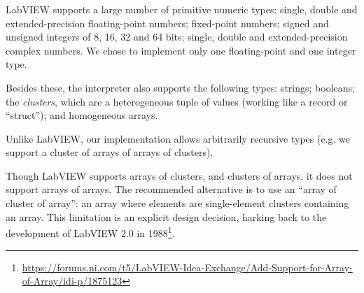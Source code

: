 \begin{hscode}\SaveRestoreHook
{}%
%
%
%
%
%
%
\>[B]{}\;\<[14]%
\>[14]{}\mathrel{=}{}\<[14E]%
\>[17]{}\;\<[E]%
\\
\>[14]{}\mid {}\<[14E]%
\>[17]{}\;\;\<[E]%
\\
\>[14]{}\mid {}\<[14E]%
\>[17]{}\<[E]%
\\
\>[14]{}\mid {}\<[14E]%
\>[17]{}\;\<[E]%
\\
\>[14]{}\mid {}\<[14E]%
\>[17]{}\;\<[E]%
\\
\>[B]{}\<[4]%
\>[4]{}\;\<[E]%
\\[\blanklineskip]%
\>[B]{}\;\<[19]%
\>[19]{}\mathrel{=}\<[E]%
\\
\>[19]{}\mid {}\<[E]%
\\
\>[19]{}\mid {}\<[E]%
\\
\>[19]{}\mid {}\<[E]%
\\
\>[B]{}\<[4]%
\>[4]{}\;\<[E]%
\ColumnHook
\end{hscode}\resethooks

LabVIEW supports a large number of primitive numeric types: single, double and
extended-precision floating-point numbers; fixed-point numbers; signed and
unsigned integers of 8, 16, 32 and 64 bits; single, double and
extended-precision complex numbers. We chose to implement only one
floating-point and one integer type.

Besides these, the interpreter also supports the following types: strings;
booleans; the \emph{clusters}, which are a heterogeneous tuple of values
(working like a record or ``struct''); and homogeneous arrays.

Unlike LabVIEW, our implementation allows arbitrarily recursive types (e.g. we
support a cluster of arrays of arrays of clusters). 

Though LabVIEW supports arrays of clusters, and clusters of arrays, it does
not support arrays of arrays. The recommended alternative is to use an ``array
of cluster of array'': an array where elements are single-element clusters
containing an array. This limitation is an explicit design decision, harking
back to the development of LabVIEW 2.0 in
1988\footnote{\url{https://forums.ni.com/t5/LabVIEW-Idea-Exchange/Add-Support-for-Array-of-Array/idi-p/1875123}}.

